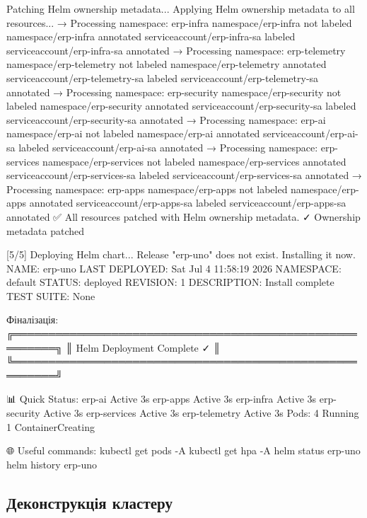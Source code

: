 \documentclass[12pt,a4paper]{article}
\let\originalfootnotesize\footnotesize
\let\oldverbatim\verbatim
\let\oldendverbatim\endverbatim
\renewenvironment{verbatim}{\originalfootnotesize\oldverbatim}{\oldendverbatim}
\begin{document}
\begin{verbatim}
[4/5] Patching Helm ownership metadata...
Applying Helm ownership metadata to all resources...
→ Processing namespace: erp-infra
namespace/erp-infra not labeled
namespace/erp-infra annotated
serviceaccount/erp-infra-sa labeled
serviceaccount/erp-infra-sa annotated
→ Processing namespace: erp-telemetry
namespace/erp-telemetry not labeled
namespace/erp-telemetry annotated
serviceaccount/erp-telemetry-sa labeled
serviceaccount/erp-telemetry-sa annotated
→ Processing namespace: erp-security
namespace/erp-security not labeled
namespace/erp-security annotated
serviceaccount/erp-security-sa labeled
serviceaccount/erp-security-sa annotated
→ Processing namespace: erp-ai
namespace/erp-ai not labeled
namespace/erp-ai annotated
serviceaccount/erp-ai-sa labeled
serviceaccount/erp-ai-sa annotated
→ Processing namespace: erp-services
namespace/erp-services not labeled
namespace/erp-services annotated
serviceaccount/erp-services-sa labeled
serviceaccount/erp-services-sa annotated
→ Processing namespace: erp-apps
namespace/erp-apps not labeled
namespace/erp-apps annotated
serviceaccount/erp-apps-sa labeled
serviceaccount/erp-apps-sa annotated
✅ All resources patched with Helm ownership metadata.
    ✓ Ownership metadata patched

[5/5] Deploying Helm chart...
Release "erp-uno" does not exist. Installing it now.
NAME: erp-uno
LAST DEPLOYED: Sat Jul  4 11:58:19 2026
NAMESPACE: default
STATUS: deployed
REVISION: 1
DESCRIPTION: Install complete
TEST SUITE: None

\end{verbatim}

\newpage
Фіналізація:
\begin{verbatim}
╔════════════════════════════════════════════════════════╗
║           Helm Deployment Complete ✓                   ║
╚════════════════════════════════════════════════════════╝

📊 Quick Status:
erp-ai               Active   3s
erp-apps             Active   3s
erp-infra            Active   3s
erp-security         Active   3s
erp-services         Active   3s
erp-telemetry        Active   3s
Pods:
   4 Running
   1 ContainerCreating

🌐 Useful commands:
   kubectl get pods -A
   kubectl get hpa -A
   helm status erp-uno
   helm history erp-uno
\end{verbatim}

\subsection{Деконструкція кластеру}
\end{document}
